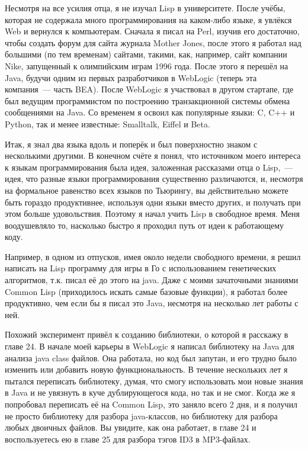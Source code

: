 Несмотря на все усилия отца, я не изучал Lisp в университете. После учёбы, которая
не содержала много программирования на каком-либо языке, я увлёкся Web и вернулся к
компьютерам. Сначала я писал на Perl, изучив его достаточно, чтобы создать форум для сайта
журнала Mother Jones, после этого я работал над большими (по тем временам) сайтами,
такими, как, например, сайт компании Nike, запущенный к олимпийским играм 1996 года. После
этого я перешёл на Java, будучи одним из первых разработчиков в WebLogic (теперь эта
компания~--- часть BEA). После WebLogic я участвовал в другом стартапе, где был ведущим
программистом по построению транзакционной системы обмена сообщениями на Java. Со временем
я освоил как популярные языки: C, C++ и Python, так и менее известные: Smalltalk, Eiffel и Beta.

Итак, я знал два языка вдоль и поперёк и был поверхностно знаком с несколькими другими.
В конечном счёте я понял, что источником моего интереса к языкам программирования
была идея, заложенная рассказами отца о Lisp,~--- идея, что разные языки
программирования существенно различаются, и, несмотря на формальное равенство всех языков
по Тьюрингу, вы действительно можете быть гораздо продуктивнее, используя
одни языки вместо других, и получать при этом больше удовольствия. Поэтому я начал учить
Lisp в свободное время. Меня воодушевляло то, насколько быстро я проходил путь от идеи к
работающему коду.

Например, в одном из отпусков, имея около недели свободного времени, я решил написать
на Lisp программу для игры в Го с использованием генетических алгоритмов, т.к. писал её
до этого на java. Даже с моими зачаточными знаниями Common Lisp (приходилось искать
самые базовые функции), я работал более продуктивно, чем если бы я писал это Java,
несмотря на несколько лет работы с ней.

Похожий эксперимент привёл к созданию библиотеки, о которой я расскажу в главе 24. В
начале моей карьеры в WebLogic я написал библиотеку на Java для анализа java class файлов.
Она работала, но код был запутан, и его трудно было изменить или добавить новую функциональность.
В течение нескольких лет я пытался переписать библиотеку,
думая, что смогу использовать мои новые знания в Java и не увязнуть в куче дублирующегося
кода, но так и не смог. Когда же я попробовал переписать её на Common Lisp, это заняло всего
2 дня, и я получил не просто библиотеку для разбора java-классов, но библиотеку для
разбора любых двоичных файлов. Вы увидите, как она работает, в главе 24 и воспользуетесь
ею в главе 25 для разбора тэгов ID3 в MP3-файлах.

